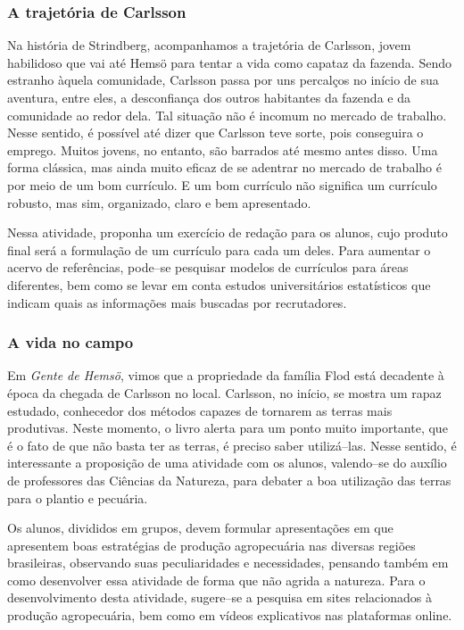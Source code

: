 \documentclass[12pt]{extarticle}
\begin{document}

\subsubsection{A trajetória de Carlsson}

Na história de Strindberg, acompanhamos a trajetória de Carlsson,
jovem habilidoso que vai até Hemsö para tentar a vida como capataz da
fazenda. Sendo estranho àquela comunidade, Carlsson passa por uns
percalços no início de sua aventura, entre eles, a desconfiança dos
outros habitantes da fazenda e da comunidade ao redor dela. Tal
situação não é incomum no mercado de trabalho. Nesse sentido, é
possível até dizer que Carlsson teve sorte, pois conseguira o emprego.
Muitos jovens, no entanto, são barrados até mesmo antes disso. Uma
forma clássica, mas ainda muito eficaz de se adentrar no mercado de
trabalho é por meio de um bom currículo. E um bom currículo não
significa um currículo robusto, mas sim, organizado, claro e bem
apresentado. 

Nessa atividade, proponha um exercício de redação para os
alunos, cujo produto final será a formulação de um currículo para cada
um deles. Para aumentar o acervo de referências, pode--se pesquisar
modelos de currículos para áreas diferentes, bem como se levar em
conta estudos universitários estatísticos que indicam quais as
informações mais buscadas por recrutadores.

\subsubsection{A vida no campo}

Em \emph{Gente de Hemsö}, vimos que a propriedade da família Flod está
decadente à época da chegada de Carlsson no local. Carlsson, no
início, se mostra um rapaz estudado, conhecedor dos métodos capazes de
tornarem as terras mais produtivas. Neste momento, o livro alerta para
um ponto muito importante, que é o fato de que não basta ter as
terras, é preciso saber utilizá--las. Nesse sentido, é interessante a
proposição de uma atividade com os alunos, valendo--se do auxílio de
professores das Ciências da Natureza, para debater a boa utilização
das terras para o plantio e pecuária. 

Os alunos, divididos em grupos,
devem formular apresentações em que apresentem boas estratégias de
produção agropecuária nas diversas regiões brasileiras, observando
suas peculiaridades e necessidades, pensando também em como
desenvolver essa atividade de forma que não agrida a natureza.
Para o desenvolvimento desta atividade, sugere--se a pesquisa em sites
relacionados à produção agropecuária, bem como em vídeos explicativos
nas plataformas online.
\end{document}
